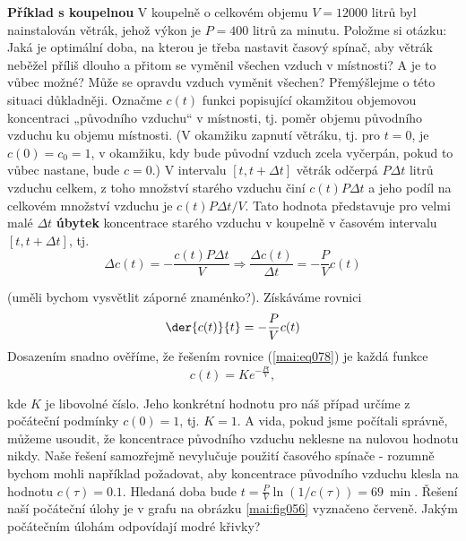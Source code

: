 \begin{mdframed}[style=mdexam]
  \begin{example}\label{mai:exam085}
    \textbf{Příklad s koupelnou}\newline
      V koupelně o celkovém objemu \(V = \num{12000}\) litrů byl nainstalován větrák, jehož výkon je
      \(P = \num{400}\) litrů za minutu. Položme si otázku: Jaká je optimální doba, na kterou je
      třeba nastavit časový spínač, aby větrák neběžel příliš dlouho a přitom se vyměnil všechen
      vzduch v místnosti? A je to vůbec možné? Může se opravdu vzduch vyměnit všechen? Přemýšlejme o
      této situaci důkladněji. Označme \(c(t)\) funkci popisující okamžitou objemovou koncentraci
      „původního vzduchu“ v místnosti, tj. poměr objemu původního vzduchu ku objemu místnosti. (V
      okamžiku zapnutí větráku, tj. pro \(t = 0\), je \(c(0) = c_0 = 1\), v okamžiku, kdy bude
      původní vzduch zcela vyčerpán, pokud to vůbec nastane, bude \(c = 0\).) V intervalu \([t,t +
      \Delta t]\) větrák odčerpá \(P\Delta t\) litrů vzduchu celkem, z toho množství starého vzduchu
      činí \(c(t)P\Delta t\) a jeho podíl na celkovém množství vzduchu je \(c(t)P\Delta t/V\). Tato
      hodnota představuje pro velmi malé \(\Delta t\) \textbf{úbytek} koncentrace starého vzduchu v
      koupelně v časovém intervalu \([t, t + \Delta t]\), tj.
      \begin{equation*}
        \Delta c(t) = - \frac{c(t)P\Delta t}{V} \Rightarrow 
        \dfrac{\Delta c(t)}{\Delta t} = - \dfrac{P}{V}c(t)
      \end{equation*}
      
      (uměli bychom vysvětlit záporné znaménko?). Získáváme rovnici
      \begin{equation}\label{mai:eq078}
        \der{c(t)}{t} = - \dfrac{P}{V}c(t)
      \end{equation}
      Dosazením snadno ověříme, že řešením rovnice (\ref{mai:eq078}) je každá funkce
      \begin{equation*}
        c(t) = Ke^{-\frac{Pt}{V}},
      \end{equation*}

      {\centering
      \captionsetup{type=figure}
      \label{mai:fig056}
      \par}
      
      kde \(K\) je libovolné číslo. Jeho konkrétní hodnotu pro náš případ určíme z počáteční
      podmínky \(c(0) = 1\), tj. \(K = 1\). A vida, pokud jsme počítali správně, můžeme usoudit, že
      koncentrace původního vzduchu neklesne na nulovou hodnotu nikdy. Naše řešení samozřejmě
      nevylučuje použití časového spínače - rozumně bychom mohli například požadovat, aby
      koncentrace původního vzduchu klesla na hodnotu \(c(\tau) = \num{0.1}\). Hledaná doba bude \(t
      =\frac{P}{V}\ln(1/c(\tau)) =\qty{69}{\min}\). Řešení naší počáteční úlohy je v grafu na obrázku
      \ref{mai:fig056} vyznačeno červeně. Jakým počátečním úlohám odpovídají modré křivky?
  \end{example}
\end{mdframed}